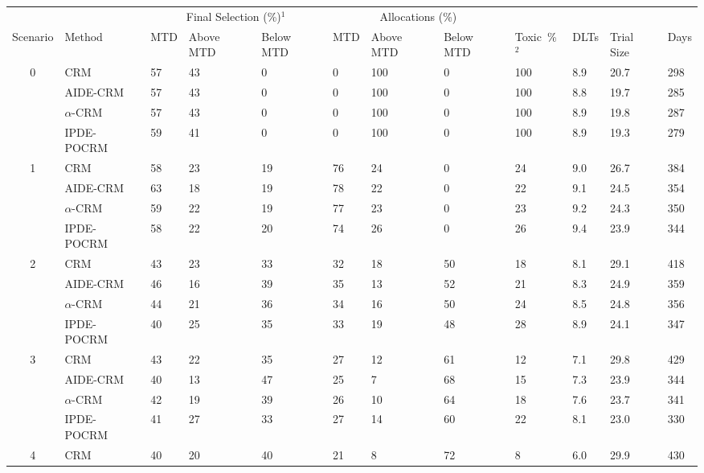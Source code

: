 \begin{tabular*}{\textwidth}{@{\extracolsep\fill}clllllllllll@{\extracolsep\fill}}
\toprule
&  & \multicolumn{3}{c}{Final Selection (\%)$^1$} & \multicolumn{3}{c}{Allocations (\%)} & &  &  &  \\
\multirow{2}{2em}{Scenario} & \multirow{2}{2em}{Method} & \multirow{2}{2em}{MTD} & \multirow{2}{2em}{Above MTD} & \multirow{2}{2em}{Below MTD} & \multirow{2}{2em}{MTD} & \multirow{2}{2em}{Above MTD} & \multirow{2}{2em}{Below MTD} & \multirow{2}{2em}{Toxic~\%$^2$} & \multirow{2}{2em}{DLTs} & \multirow{2}{2em}{Trial Size} & \multirow{2}{2em}{Days}  \\ \\ 
\midrule
\multirow{4}{2em}{0} & CRM & 57 & 43 & 0 & 0 & 100 & 0 & 100 & 8.9 & 20.7 & 298\\
 & AIDE-CRM & 57 & 43 & 0 & 0 & 100 & 0 & 100 & 8.8 & 19.7 & 285\\
 & $\alpha$-CRM & 57 & 43 & 0 & 0 & 100 & 0 & 100 & 8.9 & 19.8 & 287\\
 & IPDE-POCRM & 59 & 41 & 0 & 0 & 100 & 0 & 100 & 8.9 & 19.3 & 279\\
\midrule
\multirow{4}{2em}{1} & CRM & 58 & 23 & 19 & 76 & 24 & 0 & 24 & 9.0 & 26.7 & 384\\
 & AIDE-CRM & 63 & 18 & 19 & 78 & 22 & 0 & 22 & 9.1 & 24.5 & 354\\
 & $\alpha$-CRM & 59 & 22 & 19 & 77 & 23 & 0 & 23 & 9.2 & 24.3 & 350\\
 & IPDE-POCRM & 58 & 22 & 20 & 74 & 26 & 0 & 26 & 9.4 & 23.9 & 344\\
\midrule
\multirow{4}{2em}{2} & CRM & 43 & 23 & 33 & 32 & 18 & 50 & 18 & 8.1 & 29.1 & 418\\
 & AIDE-CRM & 46 & 16 & 39 & 35 & 13 & 52 & 21 & 8.3 & 24.9 & 359\\
 & $\alpha$-CRM & 44 & 21 & 36 & 34 & 16 & 50 & 24 & 8.5 & 24.8 & 356\\
 & IPDE-POCRM & 40 & 25 & 35 & 33 & 19 & 48 & 28 & 8.9 & 24.1 & 347\\
\midrule
\multirow{4}{2em}{3} & CRM & 43 & 22 & 35 & 27 & 12 & 61 & 12 & 7.1 & 29.8 & 429\\
 & AIDE-CRM & 40 & 13 & 47 & 25 & 7 & 68 & 15 & 7.3 & 23.9 & 344\\
 & $\alpha$-CRM & 42 & 19 & 39 & 26 & 10 & 64 & 18 & 7.6 & 23.7 & 341\\
 & IPDE-POCRM & 41 & 27 & 33 & 27 & 14 & 60 & 22 & 8.1 & 23.0 & 330\\
\midrule
\multirow{4}{2em}{4} & CRM & 40 & 20 & 40 & 21 & 8 & 72 & 8 & 6.0 & 29.9 & 430\\

\end{tabular*}
